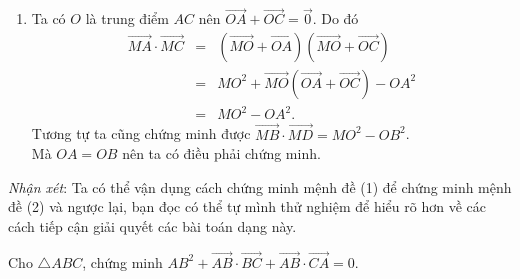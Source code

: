 \begin{vd}
{\begin{enumerate}
\begin{eqnarray*}
				& = & MB^2+MD^2+2\overrightarrow{BA}\left(\overrightarrow{BA}+\overrightarrow{DB}\right)\\
				& = & MB^2+MD^2+2\overrightarrow{BA}\cdot\overrightarrow{DA}=MB^2+MD^2.
			\end{eqnarray*}
			\item Ta có $O$ là trung điểm $AC$ nên $\overrightarrow{OA}+\overrightarrow{OC}=\overrightarrow{0}$. Do đó
			\begin{eqnarray*}
				\overrightarrow{MA}\cdot\overrightarrow{MC} & = & \left(\overrightarrow{MO}+\overrightarrow{OA}\right)\left(\overrightarrow{MO}+\overrightarrow{OC}\right)\\
				& = & MO^2+\overrightarrow{MO}\left(\overrightarrow{OA}+\overrightarrow{OC}\right)-OA^2\\
				& = & MO^2-OA^2.
			\end{eqnarray*}
			Tương tự ta cũng chứng minh được $\overrightarrow{MB}\cdot\overrightarrow{MD}=MO^2-OB^2$.\\
			Mà $OA=OB$ nên ta có điều phải chứng minh.
		\end{enumerate}
		\textit{Nhận xét}: Ta có thể vận dụng cách chứng minh mệnh đề (1) để chứng minh mệnh đề (2) và ngược lại, bạn đọc có thể tự mình thử nghiệm để hiểu rõ hơn về các cách tiếp cận giải quyết các bài toán dạng này.
	}
\end{vd}
\baitaptl
\begin{bt}%
	Cho $\triangle ABC$, chứng minh
	$AB^2+\overrightarrow{AB}\cdot\overrightarrow{BC}+\overrightarrow{AB}\cdot\overrightarrow{CA}=0$.
\end{bt}

